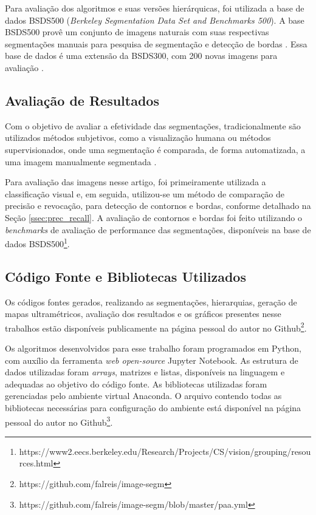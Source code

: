 \begin{document}
Para avaliação dos algoritmos e suas versões hierárquicas, foi utilizada a base de dados BSDS500 (\textit{Berkeley Segmentation Data Set and Benchmarks 500}). A base BSDS500 provê um conjunto de imagens naturais com suas respectivas segmentações manuais para pesquisa de segmentação e detecção de bordas \cite{BSDS500}. Essa base de dados é uma extensão da BSDS300, com 200 novas imagens para avaliação \cite{BSDS500}.


\subsection{Avaliação de Resultados} \label{ssec:aval_resultados}

Com o objetivo de avaliar a efetividade das segmentações, tradicionalmente são utilizados métodos subjetivos, como a visualização humana ou métodos supervisionados, onde uma segmentação é comparada, de forma automatizada, a uma imagem manualmente segmentada \cite{ZHANG2008}. 

Para avaliação das imagens nesse artigo, foi primeiramente utilizada a classificação visual e, em seguida, utilizou-se um método de comparação de precisão e revocação, para detecção de contornos e bordas, conforme detalhado na Seção \ref{ssec:prec_recall}. A avaliação de contornos e bordas foi feito utilizando o \textit{benchmarks} de avaliação de performance das segmentações, disponíveis na base de dados BSDS500\footnote{https://www2.eecs.berkeley.edu/Research/Projects/CS/vision/grouping/resources.html}.



\subsection{Código Fonte e Bibliotecas Utilizados} \label{ssec:cod_fonte}

Os códigos fontes gerados, realizando as segmentações, hierarquias, geração de mapas ultramétricos, avaliação dos resultados e os gráficos presentes nesse trabalhos estão disponíveis publicamente na página pessoal do autor no Github\footnote{https://github.com/falreis/image-segm}.

Os algoritmos desenvolvidos para esse trabalho foram programados em Python, com auxílio da ferramenta \textit{web open-source} Jupyter Notebook. As estrutura de dados utilizadas foram \textit{arrays}, matrizes e listas, disponíveis na linguagem e adequadas ao objetivo do código fonte. As bibliotecas utilizadas foram gerenciadas pelo ambiente virtual Anaconda. O arquivo contendo todas as bibliotecas necessárias para configuração do ambiente está disponível na página pessoal do autor no Github\footnote{https://github.com/falreis/image-segm/blob/master/paa.yml}.
\end{document}
